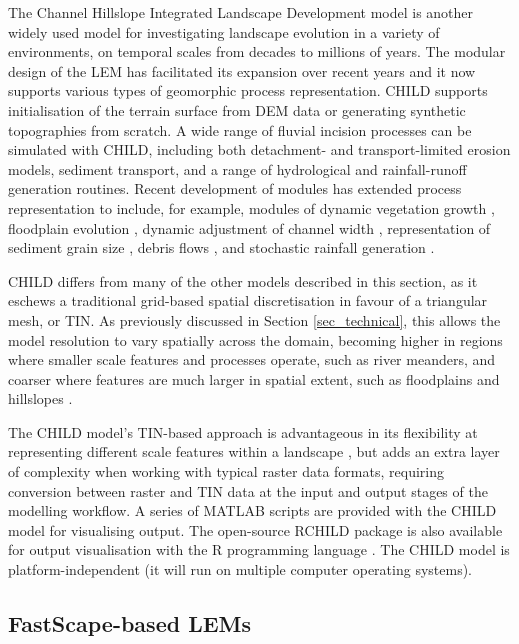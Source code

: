 The Channel Hillslope Integrated Landscape Development model \citep[CHILD][]{tucker2001child} is another widely used model for investigating landscape evolution in a variety of environments, on temporal scales from decades to millions of years. The modular design of the LEM has facilitated its expansion over recent years and it now supports various types of geomorphic process representation. CHILD supports initialisation of the terrain surface from DEM data or generating synthetic topographies from scratch. A wide range of fluvial incision processes can be simulated with CHILD, including both detachment- and transport-limited erosion models, sediment transport, and a range of hydrological and rainfall-runoff generation routines. Recent development of modules has extended process representation to include, for example, modules of dynamic vegetation growth \citep{Collins2004}, floodplain evolution \citep{Clevis2006}, dynamic adjustment of channel width \citep{Attal2008}, representation of sediment grain size \citep{Gasparini2004}, debris flows \citep{Lancaster2003}, and stochastic rainfall generation \citep{Tucker2000}.

CHILD differs from many of the other models described in this section, as it eschews a traditional grid-based spatial discretisation in favour of a triangular mesh, or TIN. As previously discussed in Section \ref{sec_technical}, this allows the model resolution to vary spatially across the domain, becoming higher in regions where smaller scale features and processes operate, such as river meanders, and coarser where features are much larger in spatial extent, such as floodplains and hillslopes \citep{Tucker2001}. 

The CHILD model’s TIN-based approach is advantageous in its flexibility at representing different scale features within a landscape \citep{Braun1997,tucker2001child}, but adds an extra layer of complexity when working with typical raster data formats, requiring conversion between raster and TIN data at the input and output stages of the modelling workflow. A series of MATLAB scripts are provided with the CHILD model for visualising output. The open-source RCHILD package is also available for output visualisation with the R programming language \citep{dietze2014rchild}. The CHILD model is platform-independent (it will run on multiple computer operating systems).

\subsection{FastScape-based LEMs}

